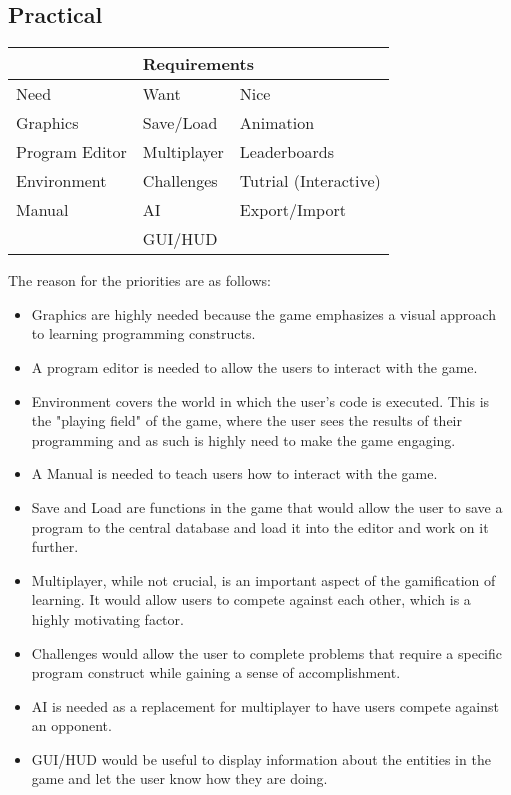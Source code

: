 \subsection*{Practical}
\begin{tabular}{|l|l|l|}
\hline
\multicolumn{3}{|c|}{Requirements}\\
\hline
Need & Want & Nice\\
\hline
Graphics & Save/Load & Animation\\
Program Editor & Multiplayer & Leaderboards\\
Environment & Challenges & Tutrial (Interactive)\\
Manual & AI & Export/Import\\
 & GUI/HUD & \\
\hline
\end{tabular}

The reason for the priorities are as follows:
\begin{itemize}
\item Graphics are highly needed because the game emphasizes a visual approach to learning programming constructs.

\item A program editor is needed to allow the users to interact with the game.

\item Environment covers the world in which the user's code is executed. This is the "playing field" of the game, where the user sees the results of their programming and as such is highly need to make the game engaging.

\item A Manual is needed to teach users how to interact with the game.
\end{itemize}

\begin{itemize}
\item Save and Load are functions in the game that would allow the user to save a program to the central database and load it into the editor and work on it further.

\item Multiplayer, while not crucial, is an important aspect of the gamification of learning. It would allow users to compete against each other, which is a highly motivating factor.

\item Challenges would allow the user to complete problems that require a specific program construct while gaining a sense of accomplishment.

\item AI is needed as a replacement for multiplayer to have users compete against an opponent.

\item GUI/HUD would be useful to display information about the entities in the game and let the user know how they are doing.
\end{itemize}

